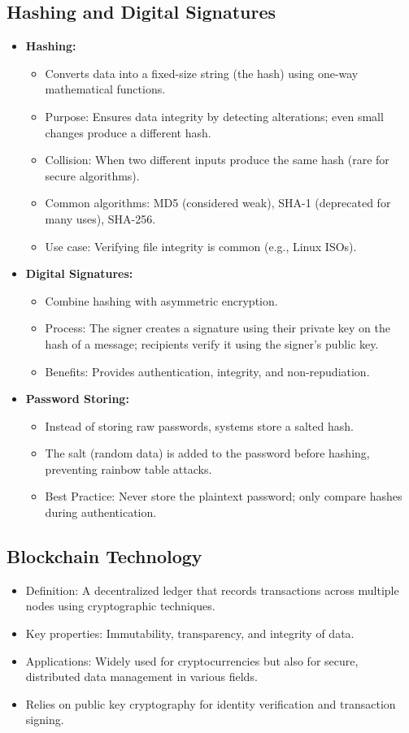 \documentclass[11pt]{article}
\begin{document}
\subsection{Hashing and Digital Signatures}
\label{sec:org0c4e87a}
\begin{itemize}
\item \textbf{\textbf{Hashing:}}
\begin{itemize}
\item Converts data into a fixed-size string (the hash) using one-way mathematical functions.
\item Purpose: Ensures data integrity by detecting alterations; even small changes produce a different hash.
\item Collision: When two different inputs produce the same hash (rare for secure algorithms).
\item Common algorithms: MD5 (considered weak), SHA-1 (deprecated for many uses), SHA-256.
\item Use case: Verifying file integrity is common (e.g., Linux ISOs).
\end{itemize}
\item \textbf{\textbf{Digital Signatures:}}
\begin{itemize}
\item Combine hashing with asymmetric encryption.
\item Process: The signer creates a signature using their private key on the hash of a message; recipients verify it using the signer's public key.
\item Benefits: Provides authentication, integrity, and non-repudiation.
\end{itemize}
\item \textbf{\textbf{Password Storing:}}
\begin{itemize}
\item Instead of storing raw passwords, systems store a salted hash.
\item The salt (random data) is added to the password before hashing, preventing rainbow table attacks.
\item Best Practice: Never store the plaintext password; only compare hashes during authentication.
\end{itemize}
\end{itemize}
\subsection{Blockchain Technology}
\label{sec:org6ce1e8b}
\begin{itemize}
\item Definition: A decentralized ledger that records transactions across multiple nodes using cryptographic techniques.
\item Key properties: Immutability, transparency, and integrity of data.
\item Applications: Widely used for cryptocurrencies but also for secure, distributed data management in various fields.
\item Relies on public key cryptography for identity verification and transaction signing.
\end{itemize}
\end{document}
